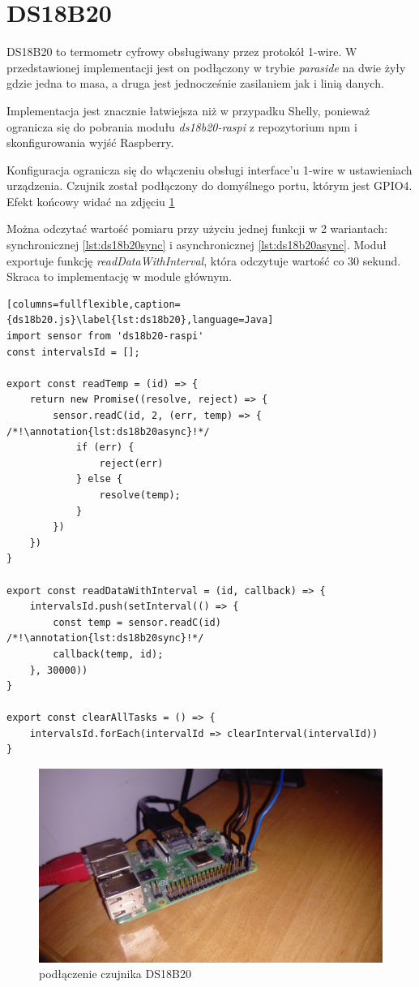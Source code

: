 \section{DS18B20}
DS18B20 to termometr cyfrowy obsługiwany przez protokół 1-wire. W przedstawionej implementacji jest on podłączony w trybie \textit{paraside} na dwie żyły gdzie jedna to masa, a druga jest jednocześnie zasilaniem jak i linią danych. 
\par Implementacja jest znacznie łatwiejsza niż w przypadku Shelly, ponieważ ogranicza się do pobrania modułu \textit{ds18b20-raspi} z repozytorium npm i skonfigurowania wyjść Raspberry. \par
Konfiguracja ogranicza się do włączeniu obsługi interface'u 1-wire w ustawieniach urządzenia. Czujnik został podłączony do domyślnego portu, którym jest GPIO4. Efekt końcowy widać na zdjęciu \ref{fig:finalGPIOConnections} \cite{linux}
\par Można odczytać wartość pomiaru przy użyciu jednej funkcji w 2 wariantach: synchronicznej \ref{lst:ds18b20sync} i asynchronicznej \ref{lst:ds18b20async}. Moduł exportuje funkcję \textit{readDataWithInterval}, która odczytuje wartość co 30 sekund. Skraca to implementację w module głównym.
\newpage
\begin{lstlisting}[columns=fullflexible,caption={ds18b20.js}\label{lst:ds18b20},language=Java]
import sensor from 'ds18b20-raspi'
const intervalsId = [];

export const readTemp = (id) => {
    return new Promise((resolve, reject) => {
        sensor.readC(id, 2, (err, temp) => { /*!\annotation{lst:ds18b20async}!*/
            if (err) {
                reject(err)
            } else {
                resolve(temp);
            }
        })
    })
}

export const readDataWithInterval = (id, callback) => {
    intervalsId.push(setInterval(() => {
        const temp = sensor.readC(id) /*!\annotation{lst:ds18b20sync}!*/
        callback(temp, id);
    }, 30000))
}

export const clearAllTasks = () => {
    intervalsId.forEach(intervalId => clearInterval(intervalId))
}
\end{lstlisting}
\begin{figure}[h]
  \includegraphics[width=\linewidth]{gpio.jpg}
  \caption{podłączenie czujnika DS18B20}
  \label{fig:finalGPIOConnections}
\end{figure}